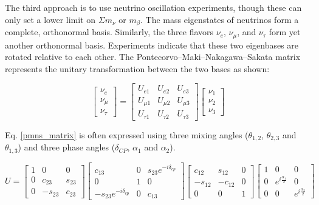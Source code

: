 
The third approach is to use neutrino oscillation experiments, though these can only set a lower limit on $\Sigma m_\nu$ or $m_\beta$. The mass eigenstates of neutrinos form a complete, orthonormal basis. Similarly, the three flavors $\nu_e$, $\nu_\mu$, and $\nu_\tau$ form yet another orthonormal basis. Experiments indicate that these two eigenbases are rotated relative to each other. The Pontecorvo–Maki–Nakagawa–Sakata matrix represents the unitary transformation between the two bases as shown:

\begin{equation}\label{pmns_matrix}
\begin{bmatrix} \nu_e \\ \nu_\mu \\ \nu_\tau \end{bmatrix} = \begin{bmatrix} U_{e1} & U_{e2} & U_{e3}\\ U_{\mu 1} & U_{\mu 2} & U_{\mu 3} \\ U_{\tau 1} & U_{\tau 2} & U_{\tau 3} \end{bmatrix} \begin{bmatrix} \nu_1 \\ \nu_2 \\ \nu_3 \end{bmatrix}
\end{equation}

Eq. \ref{pmns_matrix} is often expressed using three mixing angles ($\theta_{1,2}$, $\theta_{2,3}$ and $\theta_{1,3}$) and three phase angles ($\delta_{CP}$, $\alpha_1$ and $\alpha_2$).

\begin{equation}\label{pmns_matrix_expanded}
U = \begin{bmatrix} 1 & 0 & 0\\ 0 & c_{23} & s_{23} \\ 0 & -s_{23} & c_{23} \end{bmatrix} \begin{bmatrix} c_{13} & 0 & s_{23}e^{-i\delta_{cp}}\\ 0 & 1 & 0 \\ -s_{23}e^{-i\delta_{cp}} & 0 & c_{13} \end{bmatrix} \begin{bmatrix} c_{12} & s_{12} & 0\\ -s_{12} & -c_{12} & 0 \\ 0 & 0 & 1 \end{bmatrix} \begin{bmatrix} 1 & 0 & 0\\ 0 & e^{i\frac{\alpha_1}{2}} & 0 \\ 0 & 0 & e^{i\frac{\alpha_2}{2}}\end{bmatrix}
\end{equation}

